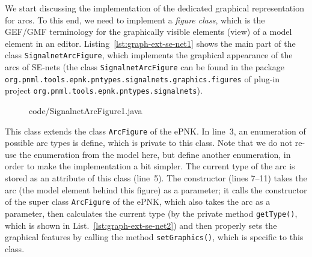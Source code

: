 We start discussing the implementation of the dedicated graphical representation
for arcs. To this end, we need to implement a \emph{figure class},%
which is the GEF/GMF terminology for the graphically visible elements (view) of
a model element in an editor. Listing~\ref{lst:graph-ext-se-net1} shows the main
part of the class {\tt SignalnetArcFigure}, which implements the graphical appearance
of the arcs of SE-nets (the class {\tt SignalnetArcFigure} can be found in the
package {\tt org.pnml.tools.epnk.pntypes.signalnets.graphics.figures} of
plug-in project {\tt org.pnml.tools.epnk.pntypes.signalnets}).
%
\begin{figure}[htbp!]
%
{code/SignalnetArcFigure1.java}
\end{figure}
%
This class extends the class {\tt ArcFigure} of the ePNK. In line~3, an
enumeration of possible arc types is define, which is private to this class. Note that we do
not re-use the enumeration from the model here, but define another enumeration,
in order to make the implementation a bit simpler. The current type of the arc
is stored as an attribute of this class (line~5). The constructor (lines
7--11) takes the arc (the model element behind this figure) as a parameter;
it calls the constructor of the super class {\tt ArcFigure}%
of the ePNK, which also takes the arc as a parameter, then calculates the
current type (by the private method {\tt getType()}, which is shown in
List.~\ref{lst:graph-ext-se-net2}) and then properly sets
the graphical features by calling the method {\tt setGraphics()}, which is specific to this class.

